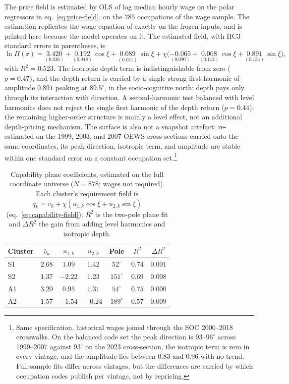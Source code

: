 \documentclass[12pt, a4paper]{article}
\begin{document}
The price field is estimated by OLS of log median hourly wage on the
polar regressors in eq.~\eqref{eq:price-field}, on the $785$
occupations of the wage sample. The estimation replicates the wage
equation of \textcite{storck2026geometry} exactly on the frozen
inputs, and is printed here because the model operates on it. The
estimated field, with HC3 standard
errors in parentheses, is
\begin{equation}
\ln \Pi(\mathbf{r}) =
\underset{(0.036)}{3.420}
+ \underset{(0.048)}{0.192}\,\cos\xi
+ \underset{(0.051)}{0.089}\,\sin\xi
+ \chi\bigl(\underset{(0.090)}{-0.065}
+ \underset{(0.112)}{0.008}\,\cos\xi
+ \underset{(0.134)}{0.891}\,\sin\xi\bigr),
\label{eq:price-estimates}
\end{equation}
with $R^2 = 0.523$. The isotropic depth term is indistinguishable from
zero ($p = 0.47$), and the depth return is carried by a single strong
first harmonic of amplitude $0.891$ peaking at $89.5^\circ$, in the
socio-cognitive north: depth pays only through its interaction with
direction. A second-harmonic test balanced with level harmonics does
not reject the single first harmonic of the depth return ($p = 0.44$);
the remaining higher-order structure is mainly a level effect, not an
additional depth-pricing mechanism. The surface is also not a snapshot
artefact: re-estimated on the 1999, 2003, and 2007 OEWS cross-sections
carried onto the same coordinates, its peak direction, isotropic term,
and amplitude are stable within one standard error on a constant
occupation set.\footnote{Same specification, historical wages joined
through the SOC 2000--2018 crosswalks. On the balanced code set the
peak direction is $93$--$96^\circ$ across 1999--2007 against $93^\circ$
on the 2023 cross-section, the isotropic term is zero in every vintage,
and the amplitude lies between $0.83$ and $0.96$ with no trend.
Full-sample fits differ across vintages, but the differences are
carried by which occupation codes publish per vintage, not by
repricing.}

\begin{table}[!htbp]
\centering
\caption{Capability plane coefficients, estimated on the full
coordinate universe ($N=878$; wages not required). Each cluster's
requirement field is $q_k=\bar v_k+\chi(u_{1,k}\cos\xi+u_{2,k}\sin\xi)$
(eq.~\eqref{eq:capability-field}); $R^2$ is the two-pole plane fit and
$\Delta R^2$ the gain from adding level harmonics and isotropic depth.}
\label{tab:plane-coefficients-new}
\begin{tabular}{lcccccc}
\toprule
Cluster & $\bar v_k$ & $u_{1,k}$ & $u_{2,k}$ & Pole & $R^2$ & $\Delta R^2$ \\
\midrule
S1 & $2.68$ & $1.09$ & $1.42$ & $52^\circ$ & $0.74$ & $0.001$ \\
S2 & $1.37$ & $-2.22$ & $1.23$ & $151^\circ$ & $0.69$ & $0.008$ \\
A1 & $3.20$ & $0.95$ & $1.31$ & $54^\circ$ & $0.75$ & $0.000$ \\
A2 & $1.57$ & $-1.54$ & $-0.24$ & $189^\circ$ & $0.57$ & $0.009$ \\
\bottomrule
\end{tabular}
\end{table}
\end{document}
